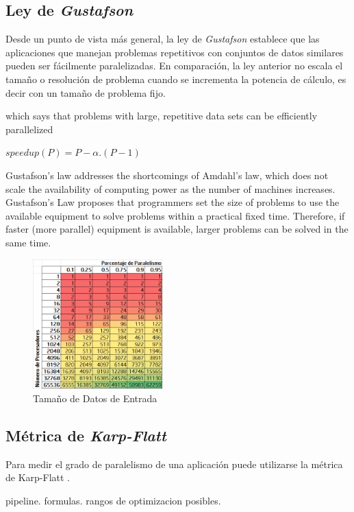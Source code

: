 \documentclass[a4paper]{report}
\begin{document}
\subsection{Ley de {\it Gustafson}}

Desde un punto de vista m\'as general, la ley de {\it Gustafson}
\cite{gustafson} establece que las aplicaciones que manejan problemas
repetitivos con conjuntos de datos similares pueden ser f\'acilmente
paralelizadas. En comparaci\'on, la ley anterior no escala el tama\~no o
resoluci\'on de problema cuando se incrementa la potencia de c\'alculo, es
decir con un tama\~no de problema fijo.

which says that problems with large, repetitive data sets can be efficiently parallelized

$ speedup(P) = P - \alpha . ( P - 1) $

Gustafson's law addresses the shortcomings of Amdahl's law, which does not scale the availability of computing power as the number of machines increases. Gustafson's Law proposes that programmers set the size of problems to use the available equipment to solve problems within a practical fixed time. Therefore, if faster (more parallel) equipment is available, larger problems can be solved in the same time.

\begin{figure}[H]
\begin{center}
\includegraphics[width=5cm]{gustafson.png}
\caption{Tama\~no de Datos de Entrada}
\end{center}
\end{figure}

\subsection{M\'etrica de {\it Karp-Flatt}}

Para medir el grado de paralelismo de una aplicaci\'on puede utilizarse la
m\'etrica de Karp-Flatt \cite{karp-flatt}.

pipeline. formulas. rangos de optimizacion posibles.
\end{document}
